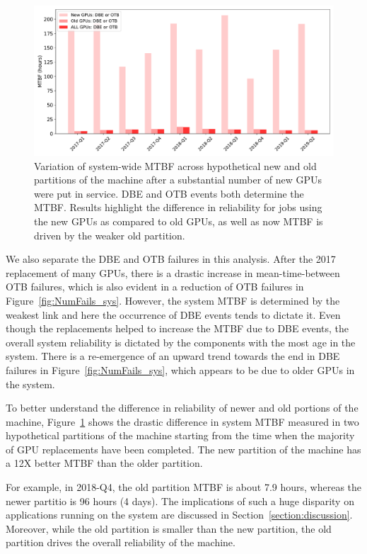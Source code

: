 \begin{figure}[bt]
  \begin{center}
    \includegraphics[trim={0 1em 0 1em},clip,width=\columnwidth]{figs/MTBF_quaterly_sys_NewOldALL.pdf}
  \end{center}
  \caption{Variation of system-wide MTBF across hypothetical new and
    old partitions of the machine after a substantial number of new GPUs
were put in service.
DBE and OTB events both determine the MTBF.
Results highlight the difference in reliability for jobs using the new GPUs as compared to old GPUs,
as well as now MTBF is driven by the weaker old partition.}
  \label{fig:MTBF_sys_NewOld}
\end{figure}
We also separate the DBE and OTB failures in this analysis. After the
2017 replacement of many GPUs, there is a drastic increase in
mean-time-between OTB failures, which is also evident in a reduction of OTB failures in Figure~\ref{fig:NumFails_sys}.
However, the system MTBF is determined by the weakest link and here the occurrence of DBE events tends to dictate it.
Even though the replacements helped to increase the MTBF due to DBE events, the overall system 
reliability is dictated by the components with the most age in the
system. There is a re-emergence of an upward trend towards 
the end in DBE failures in Figure~\ref{fig:NumFails_sys}, which
appears to be due to older GPUs in the system. 

To better understand the difference in reliability of newer and old portions of the machine, 
Figure~\ref{fig:MTBF_sys_NewOld} shows the drastic difference in system MTBF measured in two hypothetical
partitions of the machine starting from the time when the majority of GPU replacements have been completed. 
The new partition of the machine has a 12X better MTBF than the older
partition.

For example, in 2018-Q4, the old partition MTBF is about 7.9 hours,
whereas the newer partitio is 96 hours (4 days). The implications of such a huge disparity on applications running on the 
system are discussed in
Section~\ref{section:discussion}. Moreover, while the old partition is
smaller than the new partition, the old partition drives the overall reliability of
the machine.
